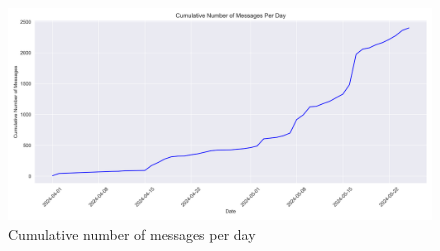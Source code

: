 \begin{figure}[H]
    \centering
    \includegraphics[width=\textwidth]{results/plots/assets/usage-08-number-of-messages-per-day.png}
    \caption{Cumulative number of messages per day}
    \label{fig:usage_08_number_of_messages_per_day}
\end{figure}